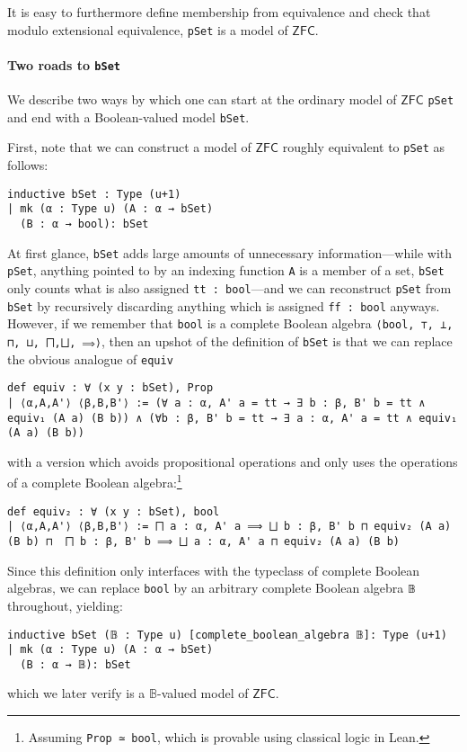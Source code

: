 \documentclass[sigplan,10pt,review, anonymous]{acmart}
\newcommand{\ZFC}{\mathsf{ZFC}}
\theoremstyle{definition}
\begin{document}
It is easy to furthermore define membership from equivalence and check that modulo extensional equivalence, \lstinline{pSet} is a model of \(\mathsf{ZFC}\).

\paragraph{Two roads to \lstinline{bSet}} We describe two ways by which one can start at the ordinary model of \(\mathsf{ZFC}\) \lstinline{pSet} and end with a Boolean-valued model \lstinline{bSet}.

First, note that we can construct a model of \(\mathsf{ZFC}\) roughly equivalent to \lstinline{pSet} as follows:
\begin{lstlisting}
inductive bSet : Type (u+1)
| mk (α : Type u) (A : α → bSet)
  (B : α → bool): bSet
\end{lstlisting}
At first glance, \lstinline{bSet} adds large amounts of unnecessary information---while with \lstinline{pSet}, anything pointed to by an indexing function \lstinline{A} is a member of a set, \lstinline{bSet} only counts what is also assigned \lstinline{tt : bool}---and we can reconstruct \lstinline{pSet} from \lstinline{bSet} by recursively discarding anything which is assigned \lstinline{ff : bool} anyways. However, if we remember that \lstinline{bool} is a complete Boolean algebra \lstinline{⟨bool, ⊤, ⊥, ⊓, ⊔, ⨅,⨆, ⟹⟩}, then an upshot of the definition of \lstinline{bSet} is that we can replace the obvious analogue of \lstinline{equiv}
\begin{lstlisting}
def equiv : ∀ (x y : bSet), Prop
| ⟨α,A,A'⟩ ⟨β,B,B'⟩ := (∀ a : α, A' a = tt → ∃ b : β, B' b = tt ∧ equiv₁ (A a) (B b)) ∧ (∀b : β, B' b = tt → ∃ a : α, A' a = tt ∧ equiv₁ (A a) (B b))
\end{lstlisting}
with a version which avoids propositional operations and only uses the operations of a complete Boolean algebra:\footnote{Assuming \lstinline{Prop ≃ bool}, which is provable using classical logic in Lean.}
\begin{lstlisting}[basicstyle=\ttfamily\small]
def equiv₂ : ∀ (x y : bSet), bool
| ⟨α,A,A'⟩ ⟨β,B,B'⟩ := ⨅ a : α, A' a ⟹ ⨆ b : β, B' b ⊓ equiv₂ (A a) (B b) ⊓  ⨅ b : β, B' b ⟹ ⨆ a : α, A' a ⊓ equiv₂ (A a) (B b)
\end{lstlisting}
Since this definition only interfaces with the typeclass of complete Boolean algebras, we can replace \lstinline{bool} by an arbitrary complete Boolean algebra \lstinline{𝔹} throughout, yielding: %
\begin{lstlisting}
inductive bSet (𝔹 : Type u) [complete_boolean_algebra 𝔹]: Type (u+1)
| mk (α : Type u) (A : α → bSet)
  (B : α → 𝔹): bSet
\end{lstlisting}
which we later verify is a \(\mathbb{B}\)-valued model of \(\ZFC\).
\end{document}
